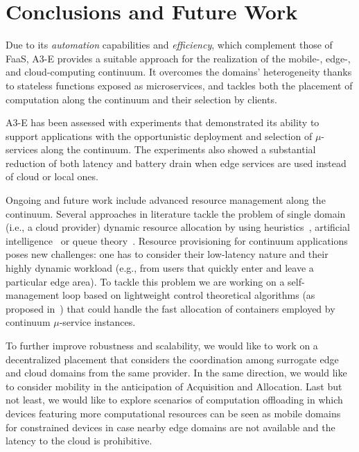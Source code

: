 \section{Conclusions and Future Work}\label{sec:conclusions}

Due to its \textit{automation} capabilities and \textit{efficiency}, which complement those of FaaS, A3-E provides a suitable approach for the realization of the mobile-, edge-, and cloud-computing continuum. It overcomes the domains' heterogeneity thanks to stateless functions exposed as microservices, and tackles both the placement of computation along the continuum and their selection by clients.

A3-E has been assessed with experiments that demonstrated its ability to support applications with the opportunistic deployment and selection of $\mu$-services along the continuum.
The experiments also showed a substantial reduction of both latency and battery drain when edge services are used instead of cloud or local ones. 

Ongoing and future work include advanced resource management along the continuum. Several approaches in literature tackle the problem of single domain (i.e., a cloud provider) dynamic resource allocation by using heuristics~\cite{dustdar0}, artificial intelligence~\cite{ia1} or queue theory~\cite{queue1}. 
Resource provisioning for continuum applications poses new challenges: one has to consider their low-latency nature and their highly dynamic workload (e.g., from users that quickly enter and leave a particular edge area). To tackle this problem we are working on a self-management loop based on lightweight control theoretical algorithms (as proposed in~\cite{Quatrocchi2016discrete}) that could handle the fast allocation of containers employed by continuum $\mu$-service instances. %


To further improve robustness and scalability, we would like to work on a decentralized placement that considers the coordination among surrogate edge and cloud domains from the same provider. In the same direction, we would like to consider mobility in the anticipation of Acquisition and Allocation. Last but not least, 
we would like to explore scenarios of computation offloading in which devices featuring more computational resources can be seen as mobile domains for constrained devices in case nearby edge domains are not available and the latency to the cloud is prohibitive.